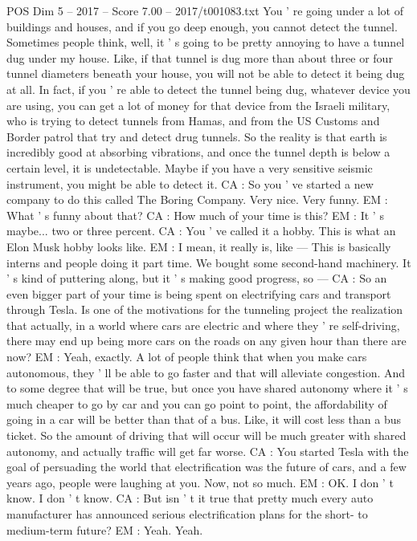 \begin{textsample}{POS Dim 5 – 2017 – Score 7.00 – 2017/t001083.txt}
You ' re going under a lot of buildings and houses, and if you go deep enough, you cannot detect the tunnel.
Sometimes people think, well, it ' s going to be pretty annoying to have a tunnel dug under my house.
Like, if that tunnel is dug more than about three or four tunnel diameters beneath your house, you will not be able to detect it being dug at all.
In fact, if you ' re able to detect the tunnel being dug, whatever device you are using, you can get a lot of money for that device from the Israeli military, who is trying to detect tunnels from Hamas, and from the US Customs and Border patrol that try and detect drug tunnels.
So the reality is that earth is incredibly good at absorbing vibrations, and once the tunnel depth is below a certain level, it is undetectable.
Maybe if you have a very sensitive seismic instrument, you might be able to detect it.
CA : So you ' ve started a new company to do this called The Boring Company.
Very nice.
Very funny.
EM : What ' s funny about that?
CA : How much of your time is this?
EM : It ' s maybe... two or three percent.
CA : You ' ve called it a hobby.
This is what an Elon Musk hobby looks like.
EM : I mean, it really is, like — This is basically interns and people doing it part time.
We bought some second-hand machinery.
It ' s kind of puttering along, but it ' s making good progress, so — CA : So an even bigger part of your time is being spent on electrifying cars and transport through Tesla.
Is one of the motivations for the tunneling project the realization that actually, in a world where cars are electric and where they ' re self-driving, there may end up being more cars on the roads on any given hour than there are now?
EM : Yeah, exactly.
A lot of people think that when you make cars autonomous, they ' ll be able to go faster and that will alleviate congestion.
And to some degree that will be true, but once you have shared autonomy where it ' s much cheaper to go by car and you can go point to point, the affordability of going in a car will be better than that of a bus.
Like, it will cost less than a bus ticket.
So the amount of driving that will occur will be much greater with shared autonomy, and actually traffic will get far worse.
CA : You started Tesla with the goal of persuading the world that electrification was the future of cars, and a few years ago, people were laughing at you.
Now, not so much.
EM : OK.
I don ' t know.
I don ' t know.
CA : But isn ' t it true that pretty much every auto manufacturer has announced serious electrification plans for the short- to medium-term future?
EM : Yeah.
Yeah.

\end{textsample}
